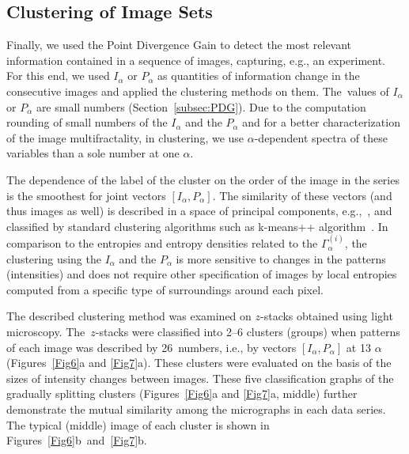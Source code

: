 \documentclass[entropy,article,accept,moreauthors,pdftex,10pt,a4paper]{mdpi}
\begin{document}
\subsection{Clustering of Image Sets}
\label{clustering}
Finally, we used the Point Divergence Gain to detect the most relevant information contained in a sequence of images, capturing, e.g., an experiment. For this end, we used $I_\alpha$ or $P_\alpha$ as quantities of information change in the consecutive images and applied the clustering methods on them. The~values of $I_\alpha$ or $P_\alpha$ are small numbers (Section~\ref{subsec:PDG}). Due to the computation rounding of small numbers of the $I_\alpha$ and the $P_\alpha$ and for a better characterization of the image multifractality, in clustering, we use $\alpha$-dependent spectra of these variables than a sole number at one $\alpha$.

The dependence of the label of the cluster on the order of the image in the series is the smoothest for joint vectors $[I_\alpha, P_\alpha]$. The similarity of these vectors (and thus images as well) is described in a space of principal components, e.g.,~\cite{PCA}, and classified by standard clustering algorithms such as k-means++ algorithm~\cite{kmeans}. In comparison to the entropies and entropy densities related to the $\Gamma_\alpha^{(i)}$, the clustering using the $I_\alpha$ and the $P_\alpha$ is more sensitive to changes in the patterns (intensities) and does not require other specification of images by local entropies computed from a specific type of surroundings around each pixel.

The described clustering method was examined on $z$-stacks obtained using light microscopy. The~$z$-stacks were classified into 2--6 clusters (groups) when patterns of each image was described by 26~numbers, i.e., by vectors $[I_\alpha, P_\alpha]$ at 13 $\alpha$ (Figures~\ref{Fig6}a and \ref{Fig7}a). These clusters were evaluated on the basis of the sizes of intensity changes between images. These five classification graphs of the gradually splitting clusters (Figures~\ref{Fig6}a and \ref{Fig7}a, {middle}) further demonstrate the mutual similarity among the micrographs in each data series. The typical (middle) image of each cluster is shown in Figures~\ref{Fig6}b~and~\ref{Fig7}b.
\end{document}
